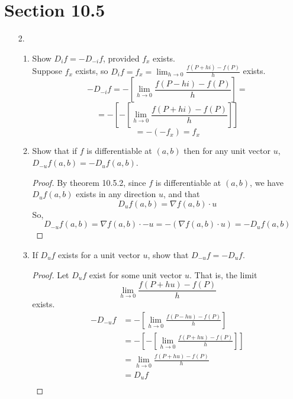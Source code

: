 \documentclass[hidelinks,12pt]{article}
\begin{document}
\section{Section 10.5}
\begin{enumerate}
    \item[2.]\begin{enumerate}
            \item Show $D_if=-D_{-i}f$, provided $f_x$ exists.\\
                Suppose $f_x$ exists, so $D_if=f_x=\lim_{h\to0}\frac{f(P+hi)-f(P)}{h}$ exists.
                \[-D_{-i}f=-\left[\lim_{h\to0}\frac{f(P-hi)-f(P)}{h}\right]=\]\[=-\left[-\left[\lim_{h\to0}\frac{f(P+hi)-f(P)}{h}\right]\right]\]\[=-(-f_x)=f_x\]
            \item Show that if $f$ is differentiable at $(a,b)$  then for any unit vector $u$, $D_{-u}f(a,b)=-D_{u}f(a,b)$.
                \begin{proof}
                    By theorem 10.5.2, since $f$ is differentiable at $(a,b)$, we have $D_uf(a,b)$ exists in any direction $u$, and that \[D_uf(a,b)=\nabla f(a,b)\cdot u\]
                    So, \[D_{-u}f(a,b)=\nabla f(a,b)\cdot -u=-(\nabla f(a,b)\cdot u)=-D_u f(a,b)\]
                \end{proof}
            \item If $D_uf$ exists for a unit vector $u$, show that $D_{-u}f=-D_uf$.
                \begin{proof}
                    Let $D_uf$ exist for some unit vector $u$. That is, the limit \[\lim_{h\to0}\frac{f(P+hu)-f(P)}{h}\] exists.
                    \begin{align*}
                        -D_{-u}f&=-\left[\lim_{h\to0}\frac{f(P-hu)-f(P)}{h}\right]\\
                                &=-\left[-\left[\lim_{h\to0}\frac{f(P+hu)-f(P)}{h}\right]\right]\\
                                &=\lim_{h\to0}\frac{f(P+hu)-f(P)}{h}\\
                                &=D_uf\\
                    \end{align*}
                \end{proof}
        \end{enumerate}
\end{enumerate}
\end{document}
